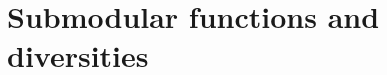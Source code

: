 \documentclass{article}
\theoremstyle{plain}
\newtheorem{theorem}{Theorem}
\theoremstyle{definition}
\newtheorem{example}[theorem]{Example}
\newcommand{\todo}[1]{\begin{center} \large \color{blue} {\bf TODO}:  #1 \end{center}}
\renewcommand{\Re}{\mathbb{R}}
\begin{document}







\section{Submodular functions and diversities}
\end{document}
